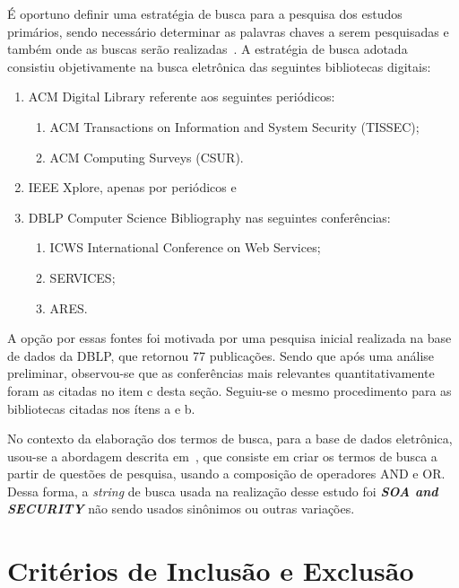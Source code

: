 É oportuno definir uma estratégia de busca para a pesquisa dos estudos primários, sendo necessário determinar as palavras chaves a serem pesquisadas e também onde as buscas serão realizadas~\cite{guidelines-2007}.
A estratégia de busca adotada consistiu objetivamente na busca eletrônica das seguintes bibliotecas digitais:
\begin{enumerate}[ a )]
    \item ACM Digital Library referente aos seguintes periódicos:
       \begin{enumerate}
            \item ACM Transactions on Information and System Security (TISSEC);
            \item ACM Computing Surveys (CSUR).
       \end{enumerate}

    \item IEEE Xplore, apenas por periódicos e
    \item DBLP Computer Science Bibliography nas seguintes conferências:
      \begin{enumerate}
            \item ICWS International Conference on Web Services;
            \item SERVICES;
            \item ARES.
      \end{enumerate}

\end{enumerate}

A opção por essas fontes foi motivada por uma pesquisa inicial realizada na base de dados da DBLP, que retornou 77 publicações. Sendo que após uma análise preliminar, observou-se que as conferências mais relevantes quantitativamente foram as citadas no item c desta seção. Seguiu-se o mesmo procedimento para as bibliotecas citadas nos ítens a e b.

No contexto da elaboração dos termos de busca, para  a base de dados eletrônica, usou-se a abordagem descrita em~\cite{guidelines-2007}, que consiste em criar os termos de busca a partir de questões de pesquisa, usando a composição de operadores AND e OR. Dessa forma, a \emph{string} de busca usada na realização desse estudo foi \textbf{\emph{SOA and SECURITY}} não sendo usados sinônimos ou outras variações.

\section{Critérios de Inclusão e Exclusão}

